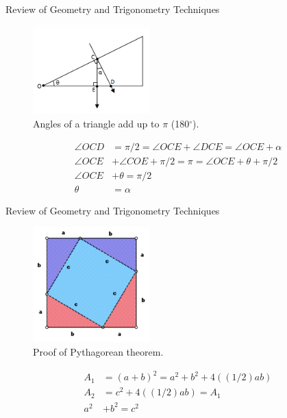 \documentclass{beamer}
\begin{document}
\begin{frame}{Review of Geometry and Trigonometry Techniques}
\small
\begin{figure}
\centering
\includegraphics[width=0.4\textwidth]{figures/incline.png}
\caption{\label{fig:incline} Angles of a triangle add up to $\pi$ (180$^{\circ}$).}
\end{figure}
\begin{align}
\angle OCD &= \pi/2 = \angle OCE + \angle DCE = \angle OCE + \alpha \\
\angle OCE & + \angle COE + \pi/2 = \pi = \angle OCE + \theta + \pi/2 \\
\angle OCE &+ \theta = \pi/2 \\
\theta &= \alpha
\end{align}
\end{frame}

\begin{frame}{Review of Geometry and Trigonometry Techniques}
\small
\begin{figure}
\centering
\includegraphics[width=0.4\textwidth]{figures/pyth.png}
\caption{\label{fig:pyth} Proof of Pythagorean theorem.}
\end{figure}
\begin{align}
A_1 &= (a+b)^2 = a^2 + b^2 + 4((1/2) a b) \\
A_2 &= c^2 + 4((1/2)ab) = A_1 \\
a^2 &+ b^2 = c^2
\end{align}
\end{frame}
\end{document}
